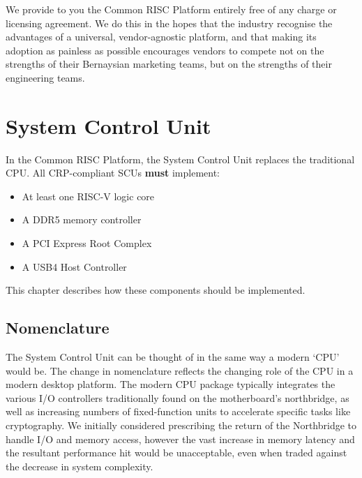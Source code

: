 \documentclass[12pt]{report}
\begin{document}
We provide to you the Common RISC Platform entirely free of any charge or licensing agreement. We do this in the hopes
that the industry recognise the advantages of a universal, vendor-agnostic platform, and that making its adoption as
painless as possible encourages vendors to compete not on the strengths of their Bernaysian marketing teams, but on
the strengths of their engineering teams.

\newpage

\chapter{System Control Unit}
\large
In the Common RISC Platform, the System Control Unit replaces the traditional CPU. All CRP-compliant SCUs \textbf{must}
implement:
\begin{itemize}
	\item At least one RISC-V logic core
	\item A DDR5 memory controller
	\item A PCI Express Root Complex
	\item A USB4 Host Controller
\end{itemize}
This chapter describes how these components should be implemented.
\normalsize
\newpage

\section{Nomenclature}
The System Control Unit can be thought of in the same way a modern `CPU' would be. The change in nomenclature reflects the
changing role of the CPU in a modern desktop platform. The modern CPU package typically integrates the various I/O controllers
traditionally found on the motherboard's northbridge, as well as increasing numbers of fixed-function units to accelerate
specific tasks like cryptography. We initially considered prescribing the return of the Northbridge to handle I/O and memory
access, however the vast increase in memory latency and the resultant performance hit would be unacceptable, even when
traded against the decrease in system complexity.
\end{document}
